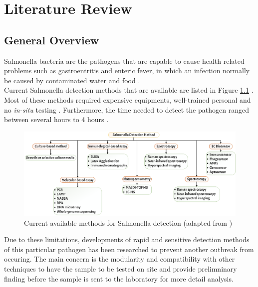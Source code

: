 \chapter{Literature Review}
\section{General Overview}
Salmonella bacteria are the pathogens that are capable to cause health related problems such as gastroentritis and enteric fever, in which an infection normally be caused by contaminated water and food \cite{bellRecentEmergingInnovations2016,pashazadehNanomaterialsUseSensing2017, pacholewiczEnvironmentalSamplingMethods2023,wangRecentAdvances3D2021}.\\

Current Salmonella detection methods that are available are listed in Figure \ref{CurrSalmDetecMetho} \cite{awangAdvancementSalmonellaDetection2021}. Most of these methods required expensive equipments, well-trained personal and no \textit{in-situ} testing \cite{shenBiosensorsRapidDetection2021,wangOverviewRapidDetection2021}. Furthermore, the time needed to detect the pathogen ranged between several hours to 4 hours  \cite{awangAdvancementSalmonellaDetection2021}.
\begin{figure}[h!]
    \centering
    \includegraphics[width=\linewidth]{Figures/Awang_2021_Salmonella_Detection.png}
    \caption{Current available methods for Salmonella detection (adapted from \cite{awangAdvancementSalmonellaDetection2021})}
    \label{CurrSalmDetecMetho}
\end{figure}

Due to these limitations, developments of rapid and sensitive detection methods of this particular pathogen has been researched to prevent another outbreak from occuring. The main concern is the modularity and compatibility with other techniques to have the sample to be tested on site and provide prelimninary finding before the sample is sent to the laboratory for more detail analysis.\newpage

